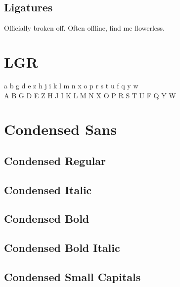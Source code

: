 \documentclass{article}
\begin{document}

\subsection*{Ligatures}


Officially broken off. Often offline, find me flowerless.


\section*{LGR}


{\robotolgr\noindent
 a b g d e z h j i k l m n x o p r s t u f q y w\\
 A B G D E Z H J I K L M N X O P R S T U F Q Y W\\
}

\section*{Condensed Sans}

\subsection*{Condensed Regular}

{\robotocondensed\lipsum[1]}

\subsection*{Condensed Italic}

{\robotocondensed\textit{\lipsum[2]}}

\subsection*{Condensed Bold}

{\robotoboldcondensed\lipsum[3]}



\subsection*{Condensed Bold Italic}

{\robotoboldcondensed\textit{\lipsum[4]}}


\subsection*{Condensed Small Capitals}
\end{document}
